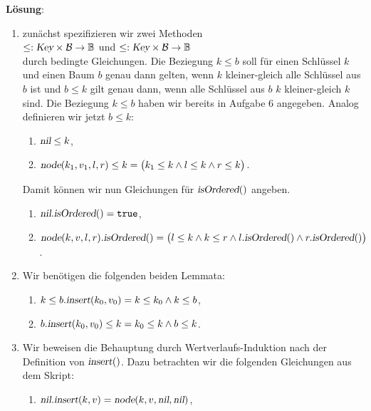 \documentclass{article}
\begin{document}
\noindent
\textbf{L\"osung}:
\begin{enumerate}
\item zun\"achst spezifizieren wir zwei Methoden
      \\[0.2cm]
      \hspace*{1.3cm} 
      $\leq: \textsl{Key} \times \mathcal{B} \rightarrow \mathbb{B}$ \quad und \quad
      $\leq: \textsl{Key} \times \mathcal{B} \rightarrow \mathbb{B}$
      \\[0.2cm]
      durch bedingte Gleichungen.  Die Beziegung $k \leq b$ soll f\"ur einen Schl\"ussel $k$ und einen Baum
      $b$ genau dann gelten, wenn $k$ kleiner-gleich alle Schl\"ussel aus $b$ ist und
      $b \leq k$ gilt genau dann, wenn alle Schl\"ussel aus $b$ $k$ kleiner-gleich  $k$ sind.
      Die Beziegung $k \leq b$ haben wir bereits in Aufgabe 6 angegeben.  Analog definieren wir jetzt
      $b \leq k$:
      \begin{enumerate}
      \item $\textsl{nil} \leq k$,
      \item $\textsl{node}(k_1,v_1,l,r) \leq k = \bigl(k_1 \leq k \wedge l \leq k \wedge r \leq k \bigr)$.
      \end{enumerate}
      Damit k\"onnen wir nun Gleichungen f\"ur $\textsl{isOrdered}()$ angeben.
      \begin{enumerate}
      \item $\textsl{nil}.\textsl{isOrdered}() = \mathtt{true}$,
      \item $\textsl{node}(k,v,l,r).\textsl{isOrdered}() = 
             \bigl(l \leq k \wedge k \leq r \wedge l.\textsl{isOrdered}() \wedge r.\textsl{isOrdered}()\bigr)$.
      \end{enumerate}
\item Wir ben\"otigen die folgenden beiden Lemmata:
      \begin{enumerate}
      \item $k \leq b.\textsl{insert}(k_0,v_0) = k \leq k_0 \wedge k \leq b$,
      \item $b.\textsl{insert}(k_0,v_0) \leq k = k_0 \leq k \wedge b \leq k$.
      \end{enumerate}
\item Wir beweisen die Behauptung durch Wertverlaufs-Induktion nach der Definition von $\textsl{insert}()$. 
      Dazu betrachten wir die folgenden Gleichungen aus dem Skript:
      \begin{enumerate}
      \item $\textsl{nil}\mathtt{.}\textsl{insert}(k,v) = \textsl{node}(k,v, \textsl{nil}, \textsl{nil})$,

\end{enumerate}
\end{enumerate}
\end{document}
